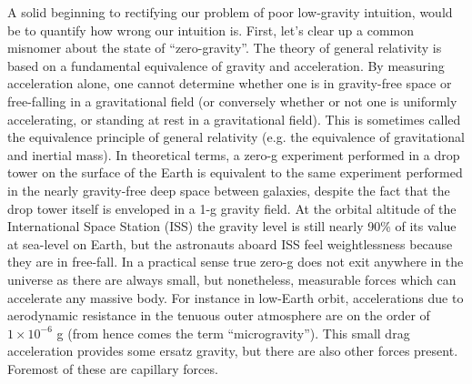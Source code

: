 \documentclass[12pt,a4paper,oneside]{book}
\begin{document}
A solid beginning to rectifying our problem of poor low-gravity intuition, would be to quantify how wrong our intuition is. First, let's clear up a common misnomer about the state of ``zero-gravity''. The theory of general relativity is based on a fundamental equivalence of gravity and acceleration. By measuring acceleration alone, one cannot determine whether one is in gravity-free space or free-falling in a gravitational field (or conversely whether or not one is uniformly accelerating, or standing at rest in a gravitational field). This is sometimes called the equivalence principle of general relativity (e.g. the equivalence of gravitational and inertial mass). In theoretical terms, a zero-g experiment performed in a drop tower on the surface of the Earth is equivalent to the same experiment performed in the nearly gravity-free deep space between galaxies, despite the fact that the drop tower itself is enveloped in a 1-g gravity field. At the orbital altitude of the International Space Station (ISS) the gravity level is still nearly 90\% of its value at sea-level on Earth, but the astronauts aboard ISS feel weightlessness because they are in free-fall. In a practical sense true zero-g does not exit anywhere in the universe as there are always small, but nonetheless, measurable forces which can accelerate any massive body. For instance in low-Earth orbit, accelerations due to aerodynamic resistance in the tenuous outer atmosphere are on the order of $1 \times 10^{-6}$ g (from hence comes the term ``microgravity''). This small drag acceleration provides some ersatz gravity, but there are also other forces present. Foremost of these are capillary forces. 
\end{document}
